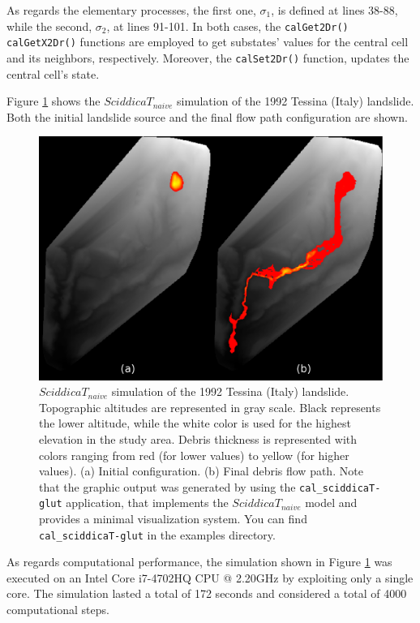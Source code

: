 As regards the elementary processes, the first one, $\sigma_1$, is
defined at lines 38-88, while the second, $\sigma_2$, at lines
91-101. In both cases, the \verb'calGet2Dr()' \verb'calGetX2Dr()'
functions are employed to get substates' values for the central cell and
its neighbors, respectively. Moreover, the \verb'calSet2Dr()'
function, updates the central cell's state.

Figure \ref{fig:sciddicaT} shows the $SciddicaT_{naive}$ simulation of the 1992
Tessina (Italy) landslide. Both the initial landslide source and the
final flow path configuration are shown.

\begin{figure}[htbp]
  \centering
  \includegraphics[width=11.5cm]{./images/OpenCAL/sciddicaT}
  \caption{$SciddicaT_{naive}$ simulation of the 1992 Tessina (Italy)
    landslide. Topographic altitudes are represented in gray
    scale. Black represents the lower altitude, while the white color
    is used for the highest elevation in the study area. Debris
    thickness is represented with colors ranging from red (for lower
    values) to yellow (for higher values). (a) Initial
    configuration. (b) Final debris flow path. Note that the graphic
    output was generated by using the \texttt{cal\_sciddicaT-glut}
    application, that implements the $SciddicaT_{naive}$ model and
    provides a minimal visualization system. You can find
    \texttt{cal\_sciddicaT-glut} in the examples directory.}
  \label{fig:sciddicaT}
\end{figure}

As regards computational performance, the simulation shown in Figure
\ref{fig:sciddicaT} was executed on an Intel Core i7-4702HQ CPU @
2.20GHz by exploiting only a single core. The simulation lasted a
total of 172 seconds and considered a total of 4000 computational
steps.

